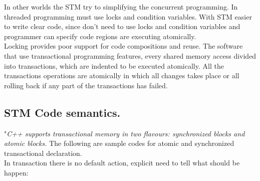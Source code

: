 \documentclass[12pt]{article}
\begin{document}
In other worlds the STM try to simplifying the concurrent programming. In threaded programming must use locks and condition variables. With STM easier to write clear code, since don't need to use locks and condition variables and programmer can specify code regions are executing atomically.\\

Locking provides poor support for code compositions and reuse. The software that use transactional programming features, every shared memory access divided into transactions, which are indented to be executed atomically. All the transactions operations are atomically in which all changes takes place or all rolling back if any part of the transactions has failed.\citep{STM}

\subsection{STM Code semantics.}
"\textit{C++ supports transactional memory in two flavours: synchronized blocks and atomic blocks.}\cite{Grimm}
The following are sample codes for atomic and synchronized transactional declaration.\\
In transaction there is no default action, explicit need to tell what should be happen:
\end{document}
